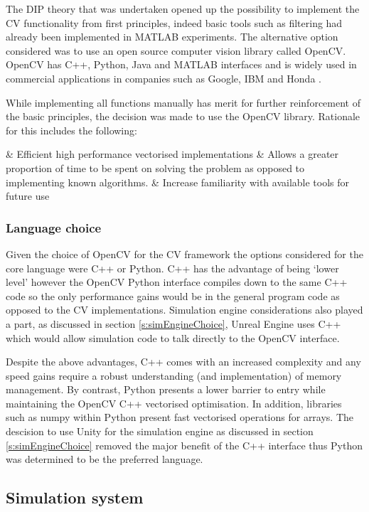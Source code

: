 \documentclass[]{aiaa-tc}%
\begin{document}
The DIP theory that was undertaken opened up the possibility to implement the CV functionality from first principles, indeed basic tools such as filtering had already been implemented in MATLAB experiments. The alternative option considered was to use an open source computer vision library called OpenCV. OpenCV has C++, Python, Java and MATLAB interfaces and is widely used in commercial applications in companies such as Google, IBM and Honda \citep{opencvWebsite}. 

While implementing all functions manually has merit for further reinforcement of the basic principles, the decision was made to use the OpenCV library. Rationale for this includes the following: 

\begin{easylist}
	& Efficient high performance vectorised implementations
	& Allows a greater proportion of time to be spent on solving the problem as opposed to implementing known algorithms.
	& Increase familiarity with available tools for future use
\end{easylist}

\subsubsection{Language choice} \label{s:pythonVc}

Given the choice of OpenCV for the CV framework the options considered for the core language were C++ or Python. C++ has the advantage of being `lower level' however the OpenCV Python interface compiles down to the same C++ code so the only performance gains would be in the general program code as opposed to the CV implementations. Simulation engine considerations also played a part, as discussed in section \ref{s:simEngineChoice}, Unreal Engine uses C++ which would allow simulation code to talk directly to the OpenCV interface.

Despite the above advantages, C++ comes with an increased complexity and any speed gains require a robust understanding (and implementation) of memory management. By contrast, Python presents a lower barrier to entry while maintaining the OpenCV C++ vectorised optimisation. In addition, libraries such as numpy within Python present fast vectorised operations for arrays. The descision to use Unity for the simulation engine as discussed in section \ref{s:simEngineChoice} removed the major benefit of the C++ interface thus Python was determined to be the preferred language.

\subsection{Simulation system}
\end{document}
